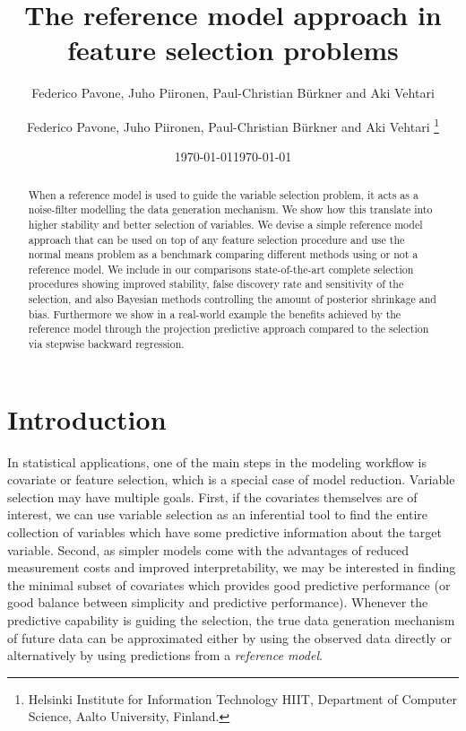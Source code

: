 \documentclass[american,]{article}
\title{The reference model approach in feature selection problems 
	\vspace{.1in}}
\author{Federico Pavone, Juho Piironen, Paul-Christian B\"{u}rkner and Aki Vehtari}
\author{
    Federico Pavone, 
  Juho Piironen,
  Paul-Christian B\"{u}rkner
  and Aki Vehtari \footnote{Helsinki Institute for Information Technology HIIT,
  Department of Computer Science, Aalto University, Finland.}
  }
\date{\today}
\date{\today}
\theoremstyle{definition}
\begin{document}
\maketitle
\begin{abstract}
When a reference model is used to guide the variable selection problem, it acts as a noise-filter modelling the data generation mechanism. We show how this translate into higher stability and better selection of variables. We devise a simple reference model approach that can be used on top of any feature selection procedure and use the normal means problem as a benchmark comparing different methods using or not a reference model. We include in our comparisons state-of-the-art complete selection procedures showing improved stability, false discovery rate and sensitivity of the selection, and also Bayesian methods controlling the amount of posterior shrinkage and bias. Furthermore we show in a real-world example the benefits achieved by the reference model through the projection predictive approach compared to the selection via stepwise backward regression.
\end{abstract}

\hypertarget{introduction}{%
\section{Introduction}\label{introduction}}

In statistical applications, one of the main steps in the modeling
workflow is covariate or feature selection, which is a special case of
model reduction. Variable selection may have multiple goals. 
First, if the covariates themselves are of interest,
we can use variable selection as an inferential tool to find the entire 
collection of variables which have some predictive information about the target variable.
Second, as simpler models come with the advantages of reduced
measurement costs and improved interpretability, we may be interested in
finding the minimal subset of covariates which
provides good predictive performance (or good balance between simplicity and
predictive performance). 
Whenever the predictive capability is guiding the selection, the true data generation
mechanism of future data can be approximated either by using the observed data directly or
alternatively by using predictions from a \emph{reference model}.
\end{document}
